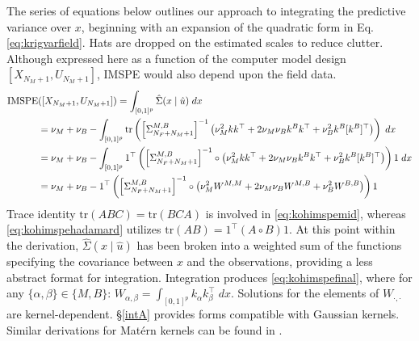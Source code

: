 \documentclass[
]{article}
\begin{document}
The series of equations below outlines our approach to integrating the predictive variance over \(x\), beginning with an expansion of the quadratic form in Eq. \eqref{eq:krigvarfield}. Hats are dropped on the estimated scales to reduce clutter. Although expressed here as a function of the computer model design \([X_{N_M + 1}, U_{N_M + 1}]\), IMSPE would also depend upon the field data.
\begin{align}
\mathrm{IMSPE}&([X_{N_M + 1}, U_{N_M + 1}]) = \int_{[0,1]^p} \hat{\Sigma}(x \mid \hat{u}) \; dx \notag \\
&= \nu_M + \nu_B - \int_{[0,1]^p} \mathrm{tr}\left( \left[\Sigma^{M,B}_{N_F + N_M + 1}\right]^{-1}\left(\nu_M^2kk^\top + 2\nu_M \nu_B k^B k^\top  + \nu_B^2 k^B [k^B]^\top\right)\right) \; dx \label{eq:kohimspemid}\\
&= \nu_M + \nu_B - \int_{[0,1]^p} 1^\top \left(\left[\Sigma^{M,B}_{N_F + N_M + 1}\right]^{-1}\circ \left(\nu_M^2kk^\top + 2\nu_M \nu_B k^B k^\top  + \nu_B^2 k^B [k^B]^\top\right)\right) 1 \; dx \label{eq:kohimspehadamard}\\
&= \nu_M + \nu_B - 1^\top \left(\left[\Sigma^{M,B}_{N_F + N_M + 1}\right]^{-1} \circ \left(\nu_M^2 W^{M,M} +  2 \nu_M \nu_B W^{M,B} +  \nu_B^2 W^{B,B}\right)\right)1
\label{eq:kohimspefinal}
\end{align}
Trace identity \(\mathrm{tr}(ABC) = \mathrm{tr}(BCA)\) is involved in \eqref{eq:kohimspemid}, whereas \eqref{eq:kohimspehadamard} utilizes \(\mathrm{tr}(AB) = 1^\top (A \circ B)1\). At this point within the derivation, \(\hat{\Sigma}(x \mid \hat{u})\) has been broken into a weighted sum of the functions specifying the covariance between \(x\) and the observations, providing a less abstract format for integration. Integration produces \eqref{eq:kohimspefinal}, where for any \(\{\alpha, \beta\} \in \{M,B\}\): \(W_{\alpha, \beta} = \int_{[0,1]^p} k_\alpha k_\beta^\top \; dx\). Solutions for the elements of \(W_{\cdot, \cdot}\) are kernel-dependent. \S \ref{intA} provides forms compatible with Gaussian kernels. Similar derivations for Matérn kernels can be found in \citet{binois2019replication}.
\end{document}
